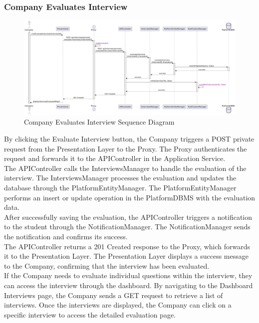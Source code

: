 \subsubsection*{Company Evaluates Interview}
\begin{figure}[H]
    \centering
    \includegraphics[width=\linewidth]{Latex/Images/DD/SequenceDiagrams/12CompanyEvaluatesInterview.png}
    \caption{Company Evaluates Interview Sequence Diagram}
    \label{fig:compevalint}
\end{figure}
By clicking the Evaluate Interview button, the Company triggers a POST private request from the Presentation Layer to the Proxy. The Proxy authenticates the request and forwards it to the APIController in the Application Service.\\
The APIController calls the InterviewsManager to handle the evaluation of the interview. The InterviewsManager processes the evaluation and updates the database through the PlatformEntityManager. The PlatformEntityManager performs an insert or update operation in the PlatformDBMS with the evaluation data.\\
After successfully saving the evaluation, the APIController triggers a notification to the student through the NotificationManager. The NotificationManager sends the notification and confirms its success.\\
The APIController returns a 201 Created response to the Proxy, which forwards it to the Presentation Layer. The Presentation Layer displays a success message to the Company, confirming that the interview has been evaluated.\\
If the Company needs to evaluate individual questions within the interview, they can access the interview through the dashboard. By navigating to the Dashboard Interviews page, the Company sends a GET request to retrieve a list of interviews. Once the interviews are displayed, the Company can click on a specific interview to access the detailed evaluation page.


